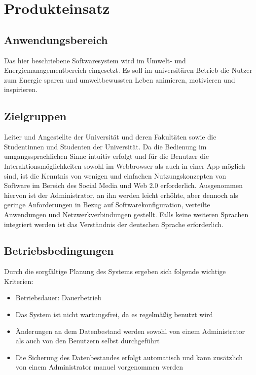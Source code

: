 \section{Produkteinsatz}
\subsection{Anwendungsbereich}
Das hier beschriebene Softwaresystem wird im Umwelt- und Energiemanagementbereich eingesetzt. Es soll im universitären Betrieb die Nutzer  zum Energie sparen und umweltbewussten Leben animieren, motivieren und inspirieren. 
\subsection{Zielgruppen}
Leiter und Angestellte der Universität und deren Fakultäten sowie die Studentinnen und Studenten der Universität. 
Da die Bedienung im umgangssprachlichen Sinne intuitiv erfolgt und für die Benutzer die Interaktionsmöglichkeiten sowohl im Webbrowser als auch in einer App möglich sind, ist die Kenntnis von wenigen und einfachen Nutzungskonzepten von Software im Bereich des Social Media und Web 2.0 erforderlich. Ausgenommen hiervon ist der Administrator, an ihn werden leicht erhöhte, aber dennoch als geringe Anforderungen in Bezug auf Softwarekonfiguration, verteilte Anwendungen und Netzwerkverbindungen gestellt. 
Falls keine weiteren Sprachen integriert werden ist das Verständnis der deutschen Sprache erforderlich. 
\subsection{Betriebsbedingungen}
Durch die sorgfältige Planung des Systems ergeben sich folgende wichtige Kriterien: 
\begin{itemize}
\item Betriebsdauer: Dauerbetrieb 
\item Das System ist nicht wartungsfrei, da es regelmäßig benutzt wird 
\item Änderungen an dem Datenbestand werden sowohl von einem Administrator als auch von den Benutzern selbst durchgeführt 
\item Die Sicherung des Datenbestandes erfolgt automatisch und kann zusätzlich von einem Administrator manuel vorgenommen werden
\end{itemize}